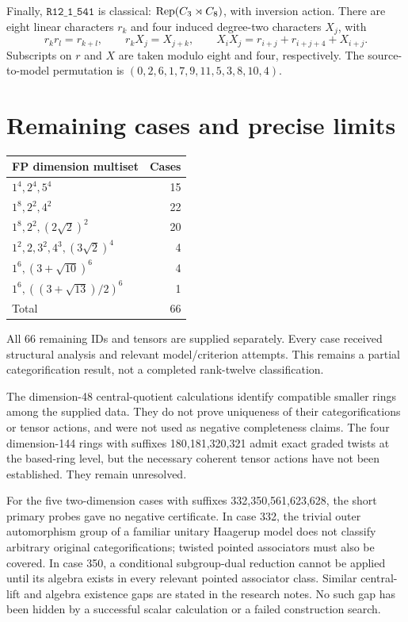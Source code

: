 \documentclass[11pt]{article}
\newcommand{\ring}[1]{\texttt{R12\_1\_#1}}
\begin{document}
Finally, $\ring{541}$ is classical: $\operatorname{Rep}(C_3\rtimes C_8)$, with inversion action.
There are eight linear characters $r_k$ and four induced degree-two characters $X_j$,
with
\[
 r_kr_l=r_{k+l},\qquad r_kX_j=X_{j+k},\qquad
 X_iX_j=r_{i+j}+r_{i+j+4}+X_{i+j}.
\]
Subscripts on $r$ and $X$ are taken modulo eight and four, respectively.
The source-to-model permutation is $(0,2,6,1,7,9,11,5,3,8,10,4)$.

\section{Remaining cases and precise limits}
\begin{center}\begin{tabular}{lr}\toprule FP dimension multiset&Cases\\\midrule
$1^4,2^4,5^4$&15\\
$1^8,2^2,4^2$&22\\
$1^8,2^2,(2\sqrt2)^2$&20\\
$1^2,2,3^2,4^3,(3\sqrt2)^4$&4\\
$1^6,(3+\sqrt{10})^6$&4\\
$1^6,((3+\sqrt{13})/2)^6$&1\\\midrule Total&66\\\bottomrule\end{tabular}\end{center}
All 66 remaining IDs and tensors are supplied separately. Every case
received structural analysis and relevant model/criterion attempts. This remains
a partial categorification result, not a completed rank-twelve classification.

The dimension-48 central-quotient calculations identify compatible smaller rings
among the supplied data. They do not prove uniqueness of their categorifications
or tensor actions, and were not used as negative completeness claims. The
four dimension-144 rings with suffixes 180,181,320,321 admit exact graded twists
at the based-ring level, but the necessary coherent tensor actions have not been
established. They remain unresolved.

For the five two-dimension cases with suffixes 332,350,561,623,628, the short primary
probes gave no negative certificate. In case 332, the trivial outer automorphism
group of a familiar unitary Haagerup model does not classify arbitrary original
categorifications; twisted pointed associators must also be covered. In case 350,
a conditional subgroup-dual reduction cannot be applied until its algebra exists
in every relevant pointed associator class. Similar central-lift and algebra
existence gaps are stated in the research notes. No such gap has been hidden by
a successful scalar calculation or a failed construction search.
\end{document}
